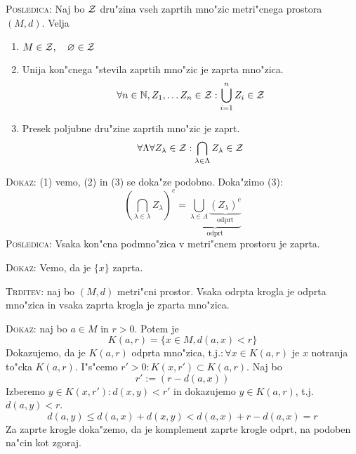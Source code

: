 \textsc{Posledica:} Naj bo $\operatorname{\mathcal{Z}}$ dru"zina vseh zaprtih mno"zic metri"cnega prostora $(M, d)$. Velja
\begin{enumerate}[(1)]
    \item $M \in \operatorname{\mathcal{Z}}, \quad \varnothing \in \operatorname{\mathcal{Z}}$
    
    \item Unija kon"cnega "stevila zaprtih mno"zic je zaprta mno"zica.
    \begin{equation*}
    \forall n \in \mathbb{N}, Z_1, \ldots Z_n \in \operatorname{\mathcal{Z}}: \bigcup_{i = 1}^n Z_i \in \operatorname{\mathcal{Z}}
    \end{equation*}
    
    \item Presek poljubne dru"zine zaprtih mno"zic je zaprt.
    \begin{equation*}
    \forall \Lambda \forall Z_\lambda \in \operatorname{\mathcal{Z}}: \bigcap_{\lambda \in \Lambda} Z_\lambda \in \operatorname{\mathcal{Z}}
    \end{equation*}
\end{enumerate}
\textsc{Dokaz:} (1) vemo, (2) in (3) se doka"ze podobno. Doka"zimo (3):
\begin{equation*}
\left( \bigcap_{\lambda \in \lambda} Z_\lambda \right)^c = \underbrace{\bigcup_{\lambda \in \Lambda} \underbrace{(Z_\lambda)^c}_\text{odprt}}_\text{odprt}
\end{equation*}
%
\textsc{Posledica:} Vsaka kon"cna podmno"zica v metri"cnem prostoru je zaprta.

\textsc{Dokaz:} Vemo, da je $\{ x \}$ zaprta.

\textsc{Trditev:} naj bo $(M, d)$ metri"cni prostor. Vsaka odrpta krogla je odprta mno"zica in vsaka zaprta krogla je zparta mno"zica.

\textsc{Dokaz:} naj bo $a \in M$ in $r > 0$. Potem je
\begin{equation*}
K(a, r) = \{ x \in M, d(a, x) < r \}
\end{equation*}
Dokazujemo, da je $K(a, r)$ odprta mno"zica, t.j.:\,$\forall x \in K(a, r)$ je $x$ notranja to"cka $K(a, r)$. I"s"cemo $r' > 0: K(x, r') \subset K(a, r)$. Naj bo
\begin{equation*}
r' := (r - d(a, x))
\end{equation*}
Izberemo $y \in K(x, r'): d(x, y) < r'$ in dokazujemo $y \in K(a, r)$, t.j.\,$d(a, y) < r$.
\begin{equation*}
d(a, y) \leq d(a, x) + d(x, y) < d(a, x) + r - d(a, x) = r
\end{equation*}
Za zaprte krogle doka"zemo, da je komplement zaprte krogle odprt, na podoben na"cin kot zgoraj.


